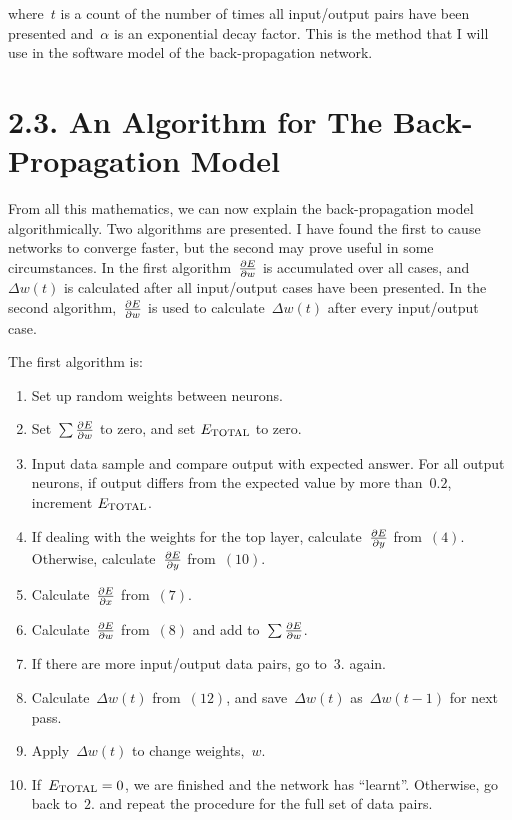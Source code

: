 \documentclass[12pt]{report}
\begin{document}
where~$t$ is a count of the number of times all input/output pairs have
been presented and~$\alpha$ is an exponential decay factor.
This is the method that I will use in the software model of the
back-propagation network.

\section{2.3. An Algorithm for The Back-Propagation Model}

From all this mathematics, we can now explain the back-propagation model
algorithmically.
Two algorithms are presented.
I have found the first to cause networks to converge faster, but the
second may prove useful in some circumstances.
In the first algorithm~$\partial E \over \partial w$ is 
accumulated over all cases, and~$\Delta w(t)$ is calculated after
all input/output cases have been presented.
In the second algorithm,~$\partial E \over \partial w$ is
used to calculate~$\Delta w(t)$ after every input/output case.

The first algorithm is:

\begin{enumerate}
\item Set up random weights between neurons.
\item Set~$\sum {\partial E \over \partial w}$ to zero, and
set $E_{\rm TOTAL}$ to zero.
\item Input data sample and compare output with expected answer.
For all output neurons, if output differs from the expected value by
more than~$0.2$, increment $E_{\rm TOTAL}$.
\item If dealing with the weights for the top layer,
calculate~$\partial E \over \partial y$ from~$(4)$. Otherwise,
calculate~$\partial E \over \partial y$ from~$(10)$.
\item Calculate~$\partial E \over \partial x$ from~$(7)$.
\item Calculate~$\partial E \over \partial w$ from~$(8)$ and
add to~$\sum {\partial E \over \partial w}$.
\item If there are more input/output data pairs, go to~$3.$
again.
\item Calculate~$\Delta w(t)$ from~$(12)$, and save~$\Delta
w(t)$ as~$\Delta w(t-1)$ for next pass.
\item Apply~$\Delta w(t)$ to change weights,~$w$.
\item If~$E_{\rm TOTAL} = 0$, we are finished and the network
has ``learnt''.
Otherwise, go back to~$2.$ and repeat the procedure for the full set
of data pairs.
\end{enumerate}
\end{document}
